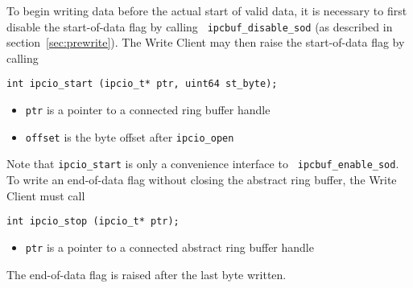 To begin writing data before the actual start of valid data, it is
necessary to first disable the start-of-data flag by calling {\tt 
ipcbuf\_disable\_sod} (as described in section~\ref{sec:prewrite}).
The Write Client may then raise the start-of-data flag by calling
\begin{verbatim}
int ipcio_start (ipcio_t* ptr, uint64 st_byte);
\end{verbatim}
\vspace{-6mm}
\begin{itemize}
\item {\tt ptr} is a pointer to a connected ring buffer handle
\vspace{-2mm}
\item {\tt offset} is the byte offset after {\tt ipcio\_open}
\end{itemize}
Note that {\tt ipcio\_start} is only a convenience interface to {\tt
ipcbuf\_enable\_sod}.  To write an end-of-data flag without closing
the abstract ring buffer, the Write Client must call
\begin{verbatim}
int ipcio_stop (ipcio_t* ptr);
\end{verbatim}
\vspace{-6mm}
\begin{itemize}
\item {\tt ptr} is a pointer to a connected abstract ring buffer handle
\end{itemize}
The end-of-data flag is raised after the last byte written.